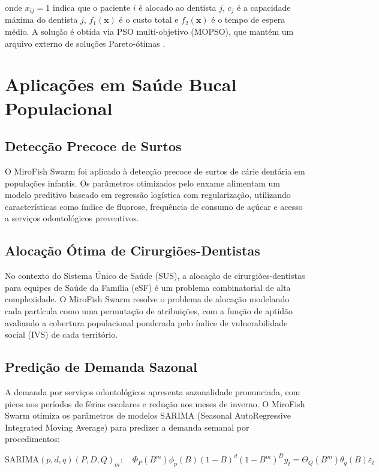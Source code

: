 onde $x_{ij} = 1$ indica que o paciente $i$ é alocado ao dentista $j$, $c_j$ é a capacidade máxima do dentista $j$, $f_1(\mathbf{x})$ é o custo total e $f_2(\mathbf{x})$ é o tempo de espera médio. A solução é obtida via PSO multi-objetivo (MOPSO), que mantém um arquivo externo de soluções Pareto-ótimas \cite{coello2004mopso}.

\section{Aplicações em Saúde Bucal Populacional}

\subsection{Detecção Precoce de Surtos}

O MiroFish Swarm foi aplicado à detecção precoce de surtos de cárie dentária em populações infantis. Os parâmetros otimizados pelo enxame alimentam um modelo preditivo baseado em regressão logística com regularização, utilizando características como índice de fluorose, frequência de consumo de açúcar e acesso a serviços odontológicos preventivos.

\subsection{Alocação Ótima de Cirurgiões-Dentistas}

No contexto do Sistema Único de Saúde (SUS), a alocação de cirurgiões-dentistas para equipes de Saúde da Família (eSF) é um problema combinatorial de alta complexidade. O MiroFish Swarm resolve o problema de alocação modelando cada partícula como uma permutação de atribuições, com a função de aptidão avaliando a cobertura populacional ponderada pelo índice de vulnerabilidade social (IVS) de cada território.

\subsection{Predição de Demanda Sazonal}

A demanda por serviços odontológicos apresenta sazonalidade pronunciada, com picos nos períodos de férias escolares e redução nos meses de inverno. O MiroFish Swarm otimiza os parâmetros de modelos SARIMA (Seasonal AutoRegressive Integrated Moving Average) para predizer a demanda semanal por procedimentos:

\begin{equation}
\text{SARIMA}(p,d,q)(P,D,Q)_m: \quad \Phi_P(B^m) \phi_p(B) (1-B)^d (1-B^m)^D y_t = \Theta_Q(B^m) \theta_q(B) \varepsilon_t
\label{eq:sarima}
\end{equation}

